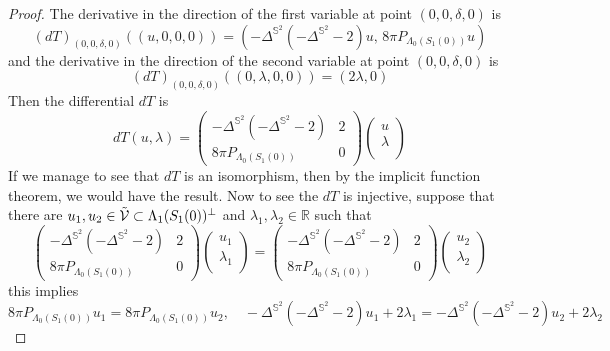 \documentclass[10pt,a4paper]{amsart}
\begin{document}
\begin{proof}
The derivative in the direction of the first variable at point $(0,0,\delta, 0) $ is 
$$(dT)_{(0,0,\delta, 0)} ( (u,0, 0,0)) = (  -\Delta^{\mathbb{S}^2} (- \Delta^{\mathbb{S}^2} -2)u   ,\,  8 \pi P_{\Lambda_0(S_1(0))} u  ) $$
and the derivative in the direction of the second variable at point $(0,0,\delta, 0) $ is 
$$(dT)_{(0,0,\delta, 0)} ( (0,\lambda, 0,0)) = (2 \lambda, 0 ) $$
Then the differential $dT$ is 
\begin{equation}
dT(u,\lambda) = 
    \begin{pmatrix}
 -\Delta^{\mathbb{S}^2} (- \Delta^{\mathbb{S}^2} -2)  & 2  \\
 8 \pi P_{\Lambda_0(S_1(0))}  & 0 
\end{pmatrix}
\begin{pmatrix}
u \\
\lambda \\
\end{pmatrix}
\end{equation}
If we manage to see that $dT$ is an isomorphism, then by the implicit function theorem, we would have the result.  Now to see the $dT$ is injective, suppose that there are $u_1,u_2 \in  \Tilde{\mathcal{V}} \subset \Lambda_1(S_1(0))^\bot $ and $ \lambda_1, \lambda_2 \in \mathbb{R} $ such that 
\begin{equation}
    \begin{pmatrix}
 -\Delta^{\mathbb{S}^2} (- \Delta^{\mathbb{S}^2} -2)  & 2  \\
 8 \pi P_{\Lambda_0(S_1(0))}  & 0 
\end{pmatrix}
\begin{pmatrix}
u_1 \\
\lambda_1 \\
\end{pmatrix}
=
\begin{pmatrix}
 -\Delta^{\mathbb{S}^2} (- \Delta^{\mathbb{S}^2} -2)  & 2  \\
 8 \pi P_{\Lambda_0(S_1(0))}  & 0 
\end{pmatrix}
\begin{pmatrix}
u_2 \\
\lambda_2 \\
\end{pmatrix}
\end{equation}
this implies 
$$  8 \pi P_{\Lambda_0(S_1(0))}u_1=  8 \pi P_{\Lambda_0(S_1(0))}u_2, \quad    -\Delta^{\mathbb{S}^2} (- \Delta^{\mathbb{S}^2} -2) u_1 +2\lambda_1=  -\Delta^{\mathbb{S}^2} (- \Delta^{\mathbb{S}^2} -2) u_2 +2\lambda_2  $$


\end{proof}
\end{document}
